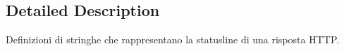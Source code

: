 \subsection{Detailed Description}
Definizioni di stringhe che rappresentano la statusline di una risposta H\+T\+T\+P. 

